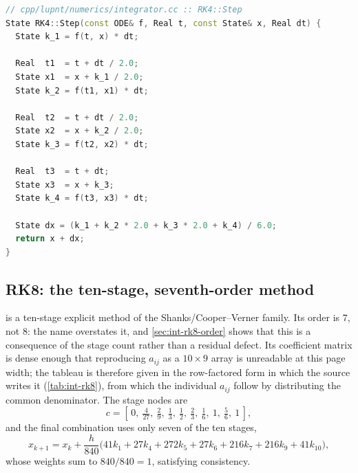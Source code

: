 \begin{lstlisting}[language=cpp, caption={Classical RK4 step. Source: \code{cpp/lupnt/numerics/integrator.cc}}, label={lst:int-rk4}]
// cpp/lupnt/numerics/integrator.cc :: RK4::Step
State RK4::Step(const ODE& f, Real t, const State& x, Real dt) {
  State k_1 = f(t, x) * dt;

  Real  t1  = t + dt / 2.0;
  State x1  = x + k_1 / 2.0;
  State k_2 = f(t1, x1) * dt;

  Real  t2  = t + dt / 2.0;
  State x2  = x + k_2 / 2.0;
  State k_3 = f(t2, x2) * dt;

  Real  t3  = t + dt;
  State x3  = x + k_3;
  State k_4 = f(t3, x3) * dt;

  State dx = (k_1 + k_2 * 2.0 + k_3 * 2.0 + k_4) / 6.0;
  return x + dx;
}
\end{lstlisting}

\subsection{RK8: the ten-stage, seventh-order method}
\label{sec:int-rk8}

 is a ten-stage explicit method of the Shanks/Cooper--Verner family.
Its order is $7$, not $8$: the name overstates it, and
\cref{sec:int-rk8-order} shows that this is a consequence of the stage count
rather than a residual defect.
Its coefficient matrix is dense enough that reproducing $a_{ij}$ as a
$10\times 9$ array is unreadable at this page width; the tableau is therefore
given in the row-factored form in which the source writes it
(\cref{tab:int-rk8}), from which the individual $a_{ij}$ follow by
distributing the common denominator. The stage nodes are
\begin{equation}
  \label{eq:int-rk8-nodes}
  c = \left[\,0,\ \tfrac{4}{27},\ \tfrac{2}{9},\ \tfrac{1}{3},\ \tfrac{1}{2},
      \ \tfrac{2}{3},\ \tfrac{1}{6},\ 1,\ \tfrac{5}{6},\ 1\,\right],
\end{equation}
and the final combination uses only seven of the ten stages,
\begin{equation}
  \label{eq:int-rk8-update}
  x_{k+1} = x_k + \frac{h}{840}\Big(
    41 k_1 + 27 k_4 + 272 k_5 + 27 k_6 + 216 k_7 + 216 k_9 + 41 k_{10}
  \Big),
\end{equation}
whose weights sum to $840/840 = 1$, satisfying consistency.


